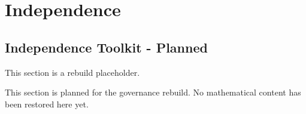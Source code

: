 \section{Independence}

\subsection*{Independence Toolkit - Planned}

\begin{exposition}
This section is a rebuild placeholder.
\end{exposition}

\begin{exposition}
This section is planned for the governance rebuild. No mathematical content has
been restored here yet.
\end{exposition}
